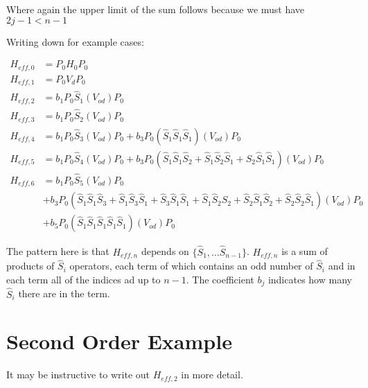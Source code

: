 \documentclass[12pt]{article}
\begin{document}
Where again the upper limit of the sum follows because we must have $2j-1<n-1$

Writing down for example cases:

\begin{equation}
\begin{split}
H_{eff,0} &= P_0 H_0 P_0\\
H_{eff,1} &= P_0 V_d P_0\\
H_{eff,2} &= b_1 P_0 \hat{S}_1(V_{od}) P_0\\
H_{eff,3} &= b_1 P_0 \hat{S}_2(V_{od}) P_0\\
H_{eff,4} &= b_1 P_0 \hat{S}_3(V_{od}) P_0 + b_3 P_0 (\hat{S}_1\hat{S}_1\hat{S}_1) (V_{od})P_0\\
H_{eff,5} &= b_1 P_0 \hat{S}_4(V_{od}) P_0 + b_3 P_0 (\hat{S}_1\hat{S}_1\hat{S}_2 + \hat{S}_1\hat{S}_2\hat{S}_1 + \hat{S}_2\hat{S}_1\hat{S}_1)(V_{od})P_0\\
H_{eff,6} &= b_1 P_0 \hat{S}_5(V_{od}) P_0\\
&+ b_3 P_0(\hat{S}_1\hat{S}_1\hat{S}_3 + \hat{S}_1\hat{S}_3\hat{S}_1 +  \hat{S}_3\hat{S}_1\hat{S}_1 + \hat{S}_1\hat{S}_2\hat{S}_2 + \hat{S}_2\hat{S}_1\hat{S}_2+\hat{S}_2\hat{S}_2\hat{S}_1)(V_{od})P_0\\
&+ b_5 P_0(\hat{S}_1\hat{S}_1\hat{S}_1\hat{S}_1\hat{S}_1)(V_{od})P_0
\end{split}
\end{equation}

The pattern here is that $H_{eff,n}$ depends on $\{\hat{S}_1, \ldots \hat{S}_{n-1}\}$. $H_{eff,n}$ is a sum of products of $\hat{S}_i$ operators, each term of which contains an odd number of $\hat{S}_i$ and in each term all of the indices ad up to $n-1$. The coefficient $b_j$ indicates how many $\hat{S}_i$ there are in the term.

\section{Second Order Example}

It may be instructive to write out $H_{eff,2}$ in more detail.
\end{document}
